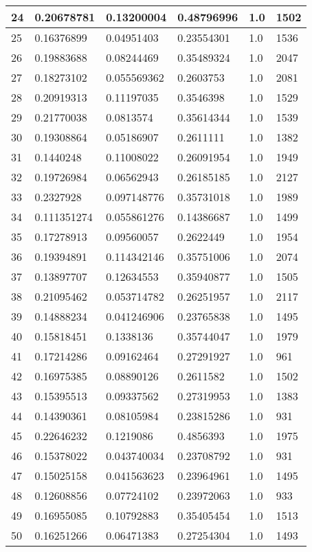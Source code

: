 \begin{longtable}{|l|l|l|l|l|l|}
24 & 0.20678781 & 0.13200004 & 0.48796996 & 1.0 & 1502 \\ \hline 
25 & 0.16376899 & 0.04951403 & 0.23554301 & 1.0 & 1536 \\ \hline 
26 & 0.19883688 & 0.08244469 & 0.35489324 & 1.0 & 2047 \\ \hline 
27 & 0.18273102 & 0.055569362 & 0.2603753 & 1.0 & 2081 \\ \hline 
28 & 0.20919313 & 0.11197035 & 0.3546398 & 1.0 & 1529 \\ \hline 
29 & 0.21770038 & 0.0813574 & 0.35614344 & 1.0 & 1539 \\ \hline 
30 & 0.19308864 & 0.05186907 & 0.2611111 & 1.0 & 1382 \\ \hline 
31 & 0.1440248 & 0.11008022 & 0.26091954 & 1.0 & 1949 \\ \hline 
32 & 0.19726984 & 0.06562943 & 0.26185185 & 1.0 & 2127 \\ \hline 
33 & 0.2327928 & 0.097148776 & 0.35731018 & 1.0 & 1989 \\ \hline 
34 & 0.111351274 & 0.055861276 & 0.14386687 & 1.0 & 1499 \\ \hline 
35 & 0.17278913 & 0.09560057 & 0.2622449 & 1.0 & 1954 \\ \hline 
36 & 0.19394891 & 0.114342146 & 0.35751006 & 1.0 & 2074 \\ \hline 
37 & 0.13897707 & 0.12634553 & 0.35940877 & 1.0 & 1505 \\ \hline 
38 & 0.21095462 & 0.053714782 & 0.26251957 & 1.0 & 2117 \\ \hline 
39 & 0.14888234 & 0.041246906 & 0.23765838 & 1.0 & 1495 \\ \hline 
40 & 0.15818451 & 0.1338136 & 0.35744047 & 1.0 & 1979 \\ \hline 
41 & 0.17214286 & 0.09162464 & 0.27291927 & 1.0 & 961 \\ \hline 
42 & 0.16975385 & 0.08890126 & 0.2611582 & 1.0 & 1502 \\ \hline 
43 & 0.15395513 & 0.09337562 & 0.27319953 & 1.0 & 1383 \\ \hline 
44 & 0.14390361 & 0.08105984 & 0.23815286 & 1.0 & 931 \\ \hline 
45 & 0.22646232 & 0.1219086 & 0.4856393 & 1.0 & 1975 \\ \hline 
46 & 0.15378022 & 0.043740034 & 0.23708792 & 1.0 & 931 \\ \hline 
47 & 0.15025158 & 0.041563623 & 0.23964961 & 1.0 & 1495 \\ \hline 
48 & 0.12608856 & 0.07724102 & 0.23972063 & 1.0 & 933 \\ \hline 
49 & 0.16955085 & 0.10792883 & 0.35405454 & 1.0 & 1513 \\ \hline 
50 & 0.16251266 & 0.06471383 & 0.27254304 & 1.0 & 1493 \\ \hline 
\end{longtable}